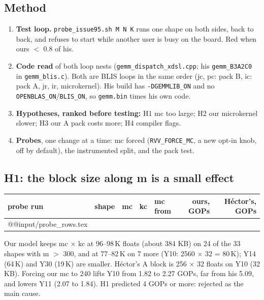 \subsection{Method}
\begin{enumerate}\setlength\itemsep{1pt}
\item \textbf{Test loop.} \texttt{probe\_issue95.sh M N K} runs one shape on both sides, back to back, and refuses to start while another user is busy on the board. Red when ours $<$ 0.8 of his.
\item \textbf{Code read} of both loop nests (\texttt{gemm\_dispatch\_xdsl.cpp}; his \texttt{gemm\_B3A2C0} in \texttt{gemm\_blis.c}). Both are BLIS loops in the same order (jc, pc: pack B, ic: pack A, jr, ir, microkernel). His build has \texttt{-DGEMMLIB\_ON} and no \texttt{OPENBLAS\_ON}/\texttt{BLIS\_ON}, so \texttt{gemm.bin} times his own code.
\item \textbf{Hypotheses, ranked before testing:} H1 mc too large; H2 our microkernel slower; H3 our A pack costs more; H4 compiler flags.
\item \textbf{Probes}, one change at a time: mc forced (\texttt{RVV\_FORCE\_MC}, a new opt-in knob, off by default), the instrumented split, and the pack test.
\end{enumerate}

\subsection{H1: the block size along m is a small effect}
\begin{center}\small
\begin{tabular}{@{}ll rrl rr@{}}
\toprule
probe run & shape & mc & kc & mc from & ours, GOPs & H\'ector's, GOPs \\
\midrule
\csname @@input\endcsname \F/probe_rows.tex
\bottomrule
\end{tabular}
\end{center}
Our model keeps mc $\times$ kc at 96--98\,K floats (about 384 KB) on 24 of the 33 shapes with m $>$ 300, and at 77--82\,K on 7 more (Y10: 2560 $\times$ 32 = 80\,K); Y14 (64\,K) and Y30 (19\,K) are smaller. H\'ector's A block is 256 $\times$ 32 floats on Y10 (32 KB). Forcing our mc to 240 lifts Y10 from 1.82 to 2.27 GOPs, far from his 5.09, and lowers Y11 (2.07 to 1.84). H1 predicted 4 GOPs or more: rejected as the main cause.


